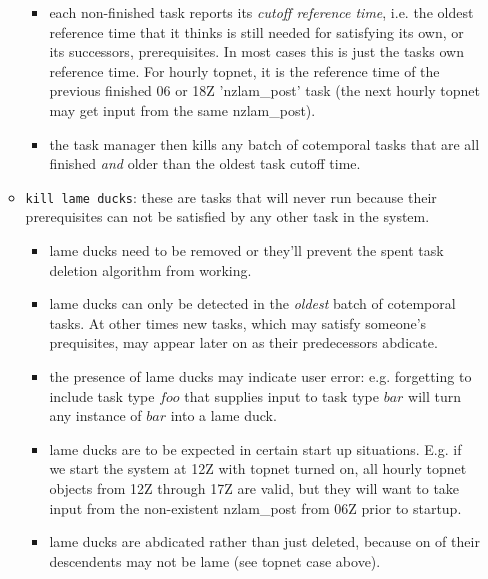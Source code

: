 \documentclass[12pt]{article}
\begin{document}
\begin{itemize}
\begin{itemize}
\begin{itemize}
       \item each non-finished task reports its {\em cutoff reference
       time}, i.e. the oldest reference time that it thinks is still
       needed for satisfying its own, or its successors, prerequisites.
       In most cases this is just the tasks own reference time. For
       hourly topnet, it is the reference time of the previous finished
       06 or 18Z 'nzlam\_post' task (the next hourly topnet may get
       input from the same nzlam\_post).  

       \item the task manager then kills any batch of cotemporal tasks
       that are all finished {\em and} older than the oldest task cutoff
       time.

       \end{itemize}

    \item \verb#kill lame ducks#: these are tasks that will never run
    because their prerequisites can not be satisfied by any other task
    in the system.  

       \begin{itemize}
       \item lame ducks need to be removed or they'll prevent the spent
       task deletion algorithm from working.
       
       \item lame ducks can only be detected in the {\em oldest} batch
       of cotemporal tasks. At other times new tasks, which may satisfy
       someone's prequisites, may appear later on as their predecessors
       abdicate.

       \item the presence of lame ducks may indicate user error: e.g.
       forgetting to include task type $foo$ that supplies input to
       task type $bar$ will turn any instance of $bar$ into a lame
       duck.

       \item lame ducks are to be expected in certain start up
       situations. E.g. if we start the system at 12Z with topnet turned
       on, all hourly topnet objects from 12Z through 17Z are valid, but
       they will want to take input from the non-existent nzlam\_post
       from 06Z prior to startup.

       \item lame ducks are abdicated rather than just deleted, because
       on of their descendents may not be lame (see topnet case above). 
       \end{itemize}
   \end{itemize}
\end{itemize}
\end{document}

